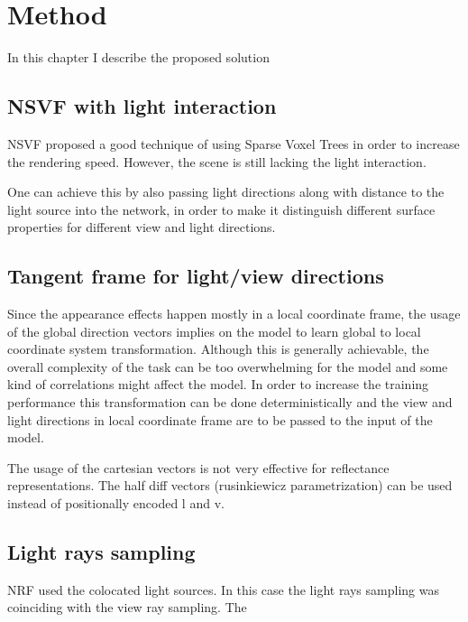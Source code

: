 \chapter{Method}
\label{chap:method}

In this chapter I describe the proposed solution


\section{NSVF with light interaction}

NSVF proposed a good technique of using Sparse Voxel Trees in order to increase the rendering speed. However, the scene is still lacking the light interaction.

One can achieve this by also passing light directions along with distance to the light source into the network, in order to make it distinguish different surface properties for different view and light directions.





\section{Tangent frame for light/view directions}

Since the appearance effects happen mostly in a local coordinate frame, the usage of the global direction vectors implies on the model to learn global to local coordinate system transformation. Although this is generally achievable, the overall complexity of the task can be too overwhelming for the model and some kind of correlations might affect the model. In order to increase the training performance this transformation can be done deterministically and the view and light directions in local coordinate frame are to be passed to the input of the model.

The usage of the cartesian vectors is not very effective for reflectance representations. The half diff vectors (rusinkiewicz parametrization) can be used instead of positionally encoded l and v.




\section{Light rays sampling}

NRF used the colocated light sources. In this case the light rays sampling was coinciding with the view ray sampling. The 








